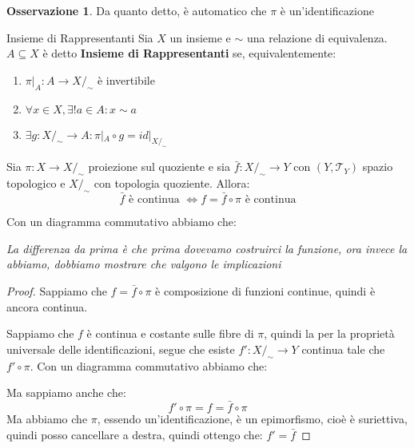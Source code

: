 \documentclass[11pt,a4paper,twoside]{article}
\theoremstyle{definition}
\newtheorem*{oss}{Osservazione}
\begin{document}
\begin{oss}
	Da quanto detto, è automatico che $\pi$ è un'identificazione
\end{oss}

\begin{defn}{Insieme di Rappresentanti}{}
	Sia $X$ un insieme e $\sim$ una relazione di equivalenza. $A \subseteq X$ è detto \textbf{Insieme di Rappresentanti} se, equivalentemente:
	\begin{enumerate}
		\item $\pi|_A:A \to X/_\sim$ è invertibile
		\item $\forall x \in X, \exists !a \in A : x \sim a$
		\item $\exists g: X/_\sim \to A : \pi|_A \circ g = id|_{X/_\sim}$
	\end{enumerate}
\end{defn}

\begin{prop}{}{}
	Sia $\pi:X \to X/_\sim$ proiezione sul quoziente e sia $\bar f:X/_\sim \to Y$ con $(Y, \mathcal T_Y)$ spazio topologico e $X/_\sim$ con topologia quoziente. Allora:
	\[ \bar f \text{ è continua }\Leftrightarrow f = \bar f \circ \pi \text{ è continua}\]
\end{prop}

Con un diagramma commutativo abbiamo che:

\begin{center}
\end{center}
\textit{La differenza da prima è che prima dovevamo costruirci la funzione, ora invece la abbiamo, dobbiamo mostrare che valgono le implicazioni}

\begin{proof}
	\fbox{$\Rightarrow$} Sappiamo che $f = \bar f \circ \pi$ è composizione di funzioni continue, quindi è ancora continua.

	\fbox{$\Leftarrow$} Sappiamo che $f$ è continua e costante sulle fibre di $\pi$, quindi la per la proprietà universale delle identificazioni, segue che esiste $f':X/_\sim \to Y$ continua tale che $f' \circ \pi$.
	Con un diagramma commutativo abbiamo che:
	\begin{center}
	\end{center}
	Ma sappiamo anche che:
	\[ f' \circ \pi = f = \bar f \circ \pi \]
	Ma abbiamo che $\pi$, essendo un'identificazione, è un epimorfismo, cioè è suriettiva, quindi posso cancellare a destra, quindi ottengo che: $f' = \bar f$
\end{proof}
\end{document}

